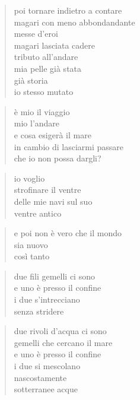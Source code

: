 	\begin{verse}
		poi tornare indietro a contare\\
		magari con meno abbondandante\\
		messe d’eroi\\
		magari lasciata cadere\\
		tributo all’andare\\
		mia pelle già stata\\
		già storia\\
		io stesso mutato
	\end{verse}

	\begin{verse}
		è mio il viaggio\\
		mio l’andare\\
		e cosa esigerà il mare\\
		in cambio di lasciarmi passare\\
		che io non possa dargli?
	\end{verse}

	\begin{verse}
		io voglio\\
		strofinare il ventre\\
		delle mie navi sul suo\\
		ventre antico
	\end{verse}

	\begin{verse}
		e poi non è vero che il mondo\\
		sia nuovo\\
		così tanto
	\end{verse}

\clearpage


	\begin{verse}
		due fili gemelli ci sono\\
		e uno è presso il confine\\
		i due s’intrecciano\\
		senza stridere
	\end{verse}

	\begin{verse}
		due rivoli d’acqua ci sono\\
		gemelli che cercano il mare\\
		e uno è presso il confine\\
		i due si mescolano\\
		nascostamente\\
		sotterranee acque
	\end{verse}

